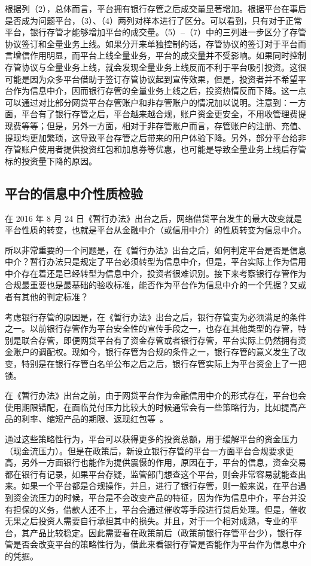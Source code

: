 \documentclass[lang=cn,11pt]{elegantpaper}
\begin{document}
根据列（2），总体而言，平台拥有银行存管之后成交量显著增加。根据平台在事后是否成为问题平台，（3）、（4）两列对样本进行了区分。可以看到，只有对于正常平台，银行存管才能够增加平台的成交量。（5）--（7）中的三列进一步区分了存管协议签订和全量业务上线。如果分开来单独控制的话，存管协议的签订对于平台而言增信作用明显，而平台上线全量业务，平台的成交量并不受影响。如果同时控制存管协议与全量业务上线，就会发现全量业务上线反而不利于平台吸引投资。这很可能是因为众多平台借助于签订存管协议起到宣传效果，但是，投资者并不希望平台作为信息中介，因而银行存管的全量业务上线之后，投资热情反而下降。这一点可以通过对比部分网贷平台存管账户和非存管账户的情况加以说明。注意到：一方面，平台有了银行存管之后，平台越来越合规，账户资金更安全，不用收管理费提现费等等；但是，另外一方面，相对于非存管账户而言，存管账户的注册、充值、提现均更加繁琐，这导致平台存管之后带来的用户体验下降。另外，部分平台给非存管账户使用者提供投资红包和加息券等优惠，也可能是导致全量业务上线后存管标的投资量下降的原因。

\subsection{平台的信息中介性质检验}

在 2016 年 8 月 24 日《暂行办法》出台之后，网络借贷平台发生的最大改变就是平台性质的转变，也就是平台从金融中介（或信用中介）的性质转变为信息中介。

所以非常重要的一个问题是，在《暂行办法》出台之后，如何判定平台是否是信息中介？暂行办法只是规定了平台必须转型为信息中介，但是，平台实际上作为信用中介存在着还是已经转型为信息中介，投资者很难识别。接下来考察银行存管作为合规最重要也是最基础的验收标准，能否作为平台作为信息中介的一个凭据？又或者有其他的判定标准？

考虑银行存管的原因是，在《暂行办法》出台之后，银行存管变为必须满足的条件之一。以前银行存管作为平台安全性的宣传手段之一，也存在其他类型的存管，特别是联合存管，即便网贷平台有了资金存管或者银行存管，平台实际上仍然拥有资金账户的调配权。现如今，银行存管为合规的条件之一，银行存管的意义发生了改变，特别是在银行存管白名单公布之后之后，银行存管实际上为平台资金上了一把锁。

在《暂行办法》出台之前，由于网贷平台作为金融信用中介的形式存在，平台也会使用期限错配，在面临兑付压力比较大的时候通常会有一些策略行为，比如提高产品的利率、缩短产品的期限、返现红包等~\citep{ddscz2019}。

通过这些策略性行为，平台可以获得更多的投资总额，用于缓解平台的资金压力（现金流压力）。但是在政策后，新设立银行存管的平台一方面平台合规要求更高，另外一方面银行也能作为提供震慑的作用，原因在于，平台的信息，资金交易都在银行有记录，如果平台存疑，监管部门想查这个平台，则会非常容易就能查出来。如果一个平台都是合规操作，并且，进行了银行存管，则一般来说，在平台遇到资金流压力的时候，平台是不会改变产品的特征，因为作为信息中介，平台并没有担保的义务，借款人还不上，平台会通过催收等手段进行贷后处理。但是，催收无果之后投资人需要自行承担其中的损失。并且，对于一个相对成熟，专业的平台，其产品比较稳定。因此需要看在政策前后（政策前银行存管平台少），银行存管是否会改变平台的策略性行为，借此来看银行存管是否能作为平台作为信息中介的凭据。
\end{document}

